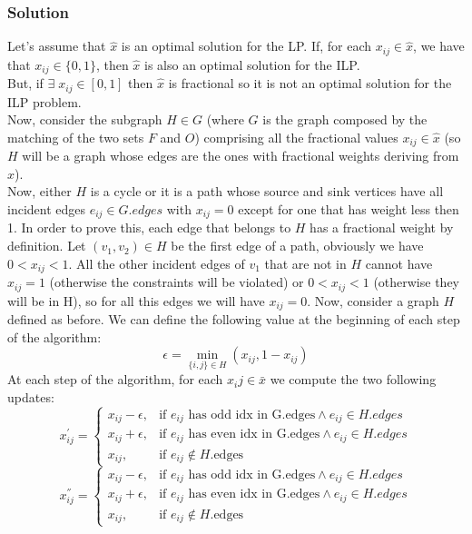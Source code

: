 \documentclass[11pt]{article}
\begin{document}
\subsubsection*{Solution}
Let's assume that $\hat{x}$ is an optimal solution for the LP. If, for each $x_{ij} \in \hat{x}$, we have that $x_{ij} \in \{0,1\}$, then $\hat{x}$ is also an optimal solution for the ILP. \\
 But, if $\exists \; x_{ij} \in [0,1]$ then $\hat{x}$ is fractional so it is not an optimal solution
for the ILP problem. \\
 Now, consider the subgraph $H \in G$ (where $G$ is the graph composed by the matching of the two sets $F$
and $O$) comprising all the fractional values $x_{ij} \in \hat{x}$ (so $H$ will be a graph whose edges are the ones with fractional weights deriving from $\hat{x}$). \\
Now, either $H$ is a cycle or it is a path whose source and sink vertices have all incident edges
$e_{ij} \in G.edges$ with $x_{ij} = 0$ except for one that has weight less then 1. In order to prove this, each edge that belongs to
$H$ has a fractional weight by definition. Let $(v_1, v_2) \in H$ be the first edge of a path, obviously we have $ 0 < x_{ij} < 1$.
All the other incident edges of $v_1$ that are not in $H$ cannot have $x_{ij} = 1$ (otherwise the constraints will be violated) or
$0 < x_{ij} < 1$ (otherwise they will be in H), so for all this edges we will have $x_{ij} = 0$. Now, consider a graph $H$ defined as before. We can define the following value at the beginning of each step of the algorithm:
\begin{equation}
\epsilon = \min_{\{i,j\} \in H} (x_{ij}, 1-x_{ij})
\end{equation}
At each step of the algorithm, for each $x_ij \in \bar{x}$ we compute the two following updates:
\begin{equation}
x_{ij}^{'} = \begin{cases}
x_{ij} - \epsilon, & \mbox{if } e_{ij} \mbox{ has odd idx in G.edges} \land e_{ij} \in H.edges \\
x_{ij} + \epsilon, & \mbox{if } e_{ij} \mbox{ has even idx in G.edges} \land e_{ij} \in H.edges\\
x_{ij} , &\mbox {if } e_{ij} \notin H.\mbox{edges}\end{cases}
\end{equation}
\begin{equation}
x_{ij}^{''} = \begin{cases}
x_{ij} - \epsilon, & \mbox{if } e_{ij} \mbox{ has odd idx in G.edges} \land e_{ij} \in H.edges \\
x_{ij} + \epsilon, & \mbox{if } e_{ij} \mbox{ has even idx in G.edges} \land e_{ij} \in H.edges\\
x_{ij} , &\mbox {if } e_{ij} \notin H.\mbox{edges}\end{cases}
\end{equation}
\end{document}
